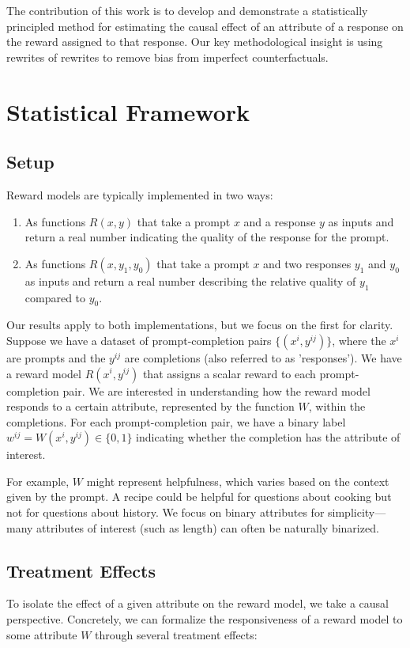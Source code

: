 \documentclass{article}
\theoremstyle{definition}
\begin{document}
The contribution of this work is to develop and demonstrate a statistically principled method for estimating the causal effect of an attribute of a response on the reward assigned to that response. Our key methodological insight is using rewrites of rewrites to remove bias from imperfect counterfactuals.

\section{Statistical Framework}

\subsection{Setup}
Reward models are typically implemented in two ways:
\begin{enumerate}
    \item As functions $R(x, y)$ that take a prompt $x$ and a response $y$ as inputs and return a real number indicating the quality of the response for the prompt.
    \item As functions $R(x, y_1, y_0)$ that take a prompt $x$ and two responses $y_1$ and $y_0$ as inputs and return a real number describing the relative quality of $y_1$ compared to $y_0$.
\end{enumerate}

Our results apply to both implementations, but we focus on the first for clarity. Suppose we have a dataset of prompt-completion pairs $\{(x^i, y^{ij})\}$, where the $x^i$ are prompts and the $y^{ij}$ are completions (also referred to as 'responses'). We have a reward model $R(x^i, y^{ij})$ that assigns a scalar reward to each prompt-completion pair. We are interested in understanding how the reward model responds to a certain attribute, represented by the function $W$, within the completions. For each prompt-completion pair, we have a binary label $w^{ij} = W(x^i, y^{ij}) \in \{0, 1\}$ indicating whether the completion has the attribute of interest.

For example, $W$ might represent helpfulness, which varies based on the context given by the prompt. A recipe could be helpful for questions about cooking but not for questions about history. We focus on binary attributes for simplicity—many attributes of interest (such as length) can often be naturally binarized.

\subsection{Treatment Effects}
To isolate the effect of a given attribute on the reward model, we take a causal perspective. Concretely, we can formalize the responsiveness of a reward model to some attribute $W$ through several treatment effects:
\end{document}
